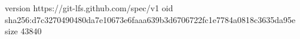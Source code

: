 version https://git-lfs.github.com/spec/v1
oid sha256:d7c3270490480da7e10673e6faaa639b3d6706722fc1e7784a0818c3635da95e
size 43840
